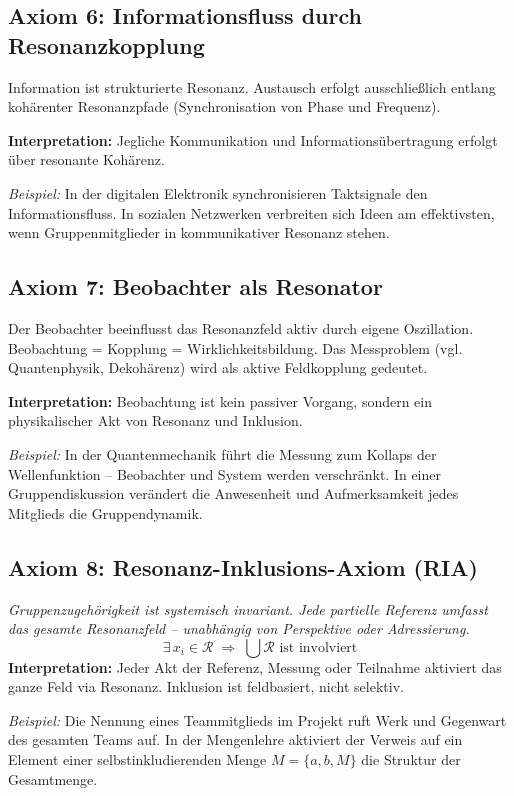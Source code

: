 \documentclass[12pt]{article}
\begin{document}
\subsection{Axiom 6: Informationsfluss durch Resonanzkopplung}
Information ist strukturierte Resonanz. Austausch erfolgt ausschließlich entlang kohärenter Resonanzpfade (Synchronisation von Phase und Frequenz).

\textbf{Interpretation:} Jegliche Kommunikation und Informationsübertragung erfolgt über resonante Kohärenz.

\textit{Beispiel:} In der digitalen Elektronik synchronisieren Taktsignale den Informationsfluss. In sozialen Netzwerken verbreiten sich Ideen am effektivsten, wenn Gruppenmitglieder in kommunikativer Resonanz stehen.

\subsection{Axiom 7: Beobachter als Resonator}
Der Beobachter beeinflusst das Resonanzfeld aktiv durch eigene Oszillation. Beobachtung = Kopplung = Wirklichkeitsbildung. Das Messproblem (vgl. Quantenphysik, Dekohärenz) wird als aktive Feldkopplung gedeutet.

\textbf{Interpretation:} Beobachtung ist kein passiver Vorgang, sondern ein physikalischer Akt von Resonanz und Inklusion.

\textit{Beispiel:} In der Quantenmechanik führt die Messung zum Kollaps der Wellenfunktion – Beobachter und System werden verschränkt. In einer Gruppendiskussion verändert die Anwesenheit und Aufmerksamkeit jedes Mitglieds die Gruppendynamik.

\subsection{Axiom 8: Resonanz-Inklusions-Axiom (RIA)}
\textit{Gruppenzugehörigkeit ist systemisch invariant. Jede partielle Referenz umfasst das gesamte Resonanzfeld – unabhängig von Perspektive oder Adressierung.}
\[
\exists\, x_i \in \mathcal{R} \;\Rightarrow\; \bigcup \mathcal{R} \text{ ist involviert}
\]
\textbf{Interpretation:} Jeder Akt der Referenz, Messung oder Teilnahme aktiviert das ganze Feld via Resonanz. Inklusion ist feldbasiert, nicht selektiv.

\textit{Beispiel:} Die Nennung eines Teammitglieds im Projekt ruft Werk und Gegenwart des gesamten Teams auf. In der Mengenlehre aktiviert der Verweis auf ein Element einer selbstinkludierenden Menge $M = \{a, b, M\}$ die Struktur der Gesamtmenge.
\end{document}
